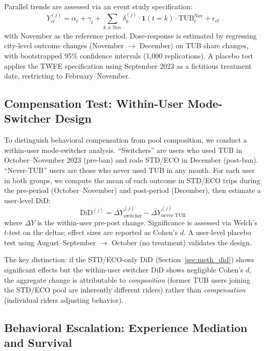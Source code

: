 Parallel trends are assessed via an event study specification:
\begin{equation}
    Y_{ct}^{(j)} = \alpha_c + \gamma_t + \sum_{k \neq \text{Nov}} \delta_k^{(j)} \cdot \mathbf{1}(t = k) \cdot \text{TUB}^{\text{Nov}}_c + \epsilon_{ct}
    \label{eq:event_study}
\end{equation}
with November as the reference period. Dose-response is estimated by regressing city-level outcome changes (November $\rightarrow$ December) on TUB share changes, with bootstrapped 95\% confidence intervals (1,000 replications). A placebo test applies the TWFE specification using September 2023 as a fictitious treatment date, restricting to February--November.

\subsection{Compensation Test: Within-User Mode-Switcher Design}
\label{sec:meth_compensation}

To distinguish behavioral compensation from pool composition, we conduct a within-user mode-switcher analysis. ``Switchers'' are users who used TUB in October--November 2023 (pre-ban) and rode STD/ECO in December (post-ban). ``Never-TUB'' users are those who never used TUB in any month. For each user in both groups, we compute the mean of each outcome in STD/ECO trips during the pre-period (October--November) and post-period (December), then estimate a user-level DiD:
\begin{equation}
    \text{DiD}^{(j)} = \overline{\Delta Y}_{\text{switcher}}^{(j)} - \overline{\Delta Y}_{\text{never-TUB}}^{(j)}
    \label{eq:switcher_did}
\end{equation}
where $\Delta Y$ is the within-user pre-post change. Significance is assessed via Welch's $t$-test on the deltas; effect sizes are reported as Cohen's $d$. A user-level placebo test using August--September $\rightarrow$ October (no treatment) validates the design.

The key distinction: if the STD/ECO-only DiD (Section~\ref{sec:meth_did}) shows significant effects but the within-user switcher DiD shows negligible Cohen's $d$, the aggregate change is attributable to \textit{composition} (former TUB users joining the STD/ECO pool are inherently different riders) rather than \textit{compensation} (individual riders adjusting behavior).

\subsection{Behavioral Escalation: Experience Mediation and Survival}
\label{sec:meth_escalation}

